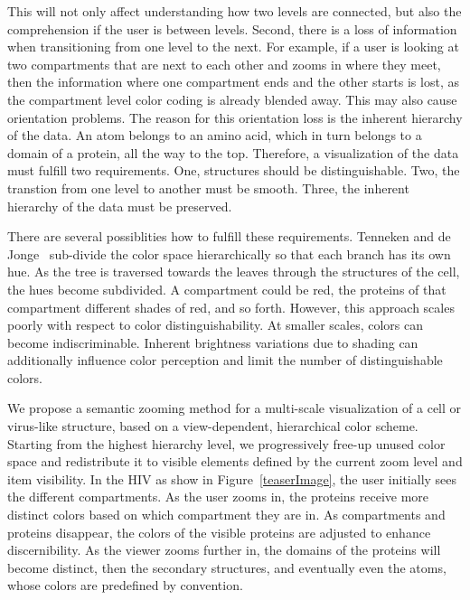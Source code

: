 \documentclass[review,journal]{vgtc}         %
\begin{document}
	This will not only affect understanding how two levels are connected, but also the comprehension if the user is between levels.
	Second, there is a loss of information when transitioning from one level to the next. 
	For example, if a user is looking at two compartments that are next to each other and zooms in where they meet, then the information where one compartment ends and the other starts is lost, as the compartment level color coding is already blended away. 
	This may also cause orientation problems.
	The reason for this orientation loss is the inherent hierarchy of the data.
	An atom belongs to an amino acid, which in turn belongs to a domain of a protein, all the way to the top.	
	Therefore, a visualization of the data must fulfill two requirements. 
	One, structures should be distinguishable.
	Two, the transtion from one level to another must be smooth.
	Three, the inherent hierarchy of the data must be preserved.
	
	There are several possiblities how to fulfill these requirements. 
	Tenneken and de Jonge~\cite{tennekes2014tree} sub-divide the color space hierarchically so that each branch has its own hue.
	As the tree is traversed towards the leaves through the structures of the cell, the hues become subdivided.
	A compartment could be red, the proteins of that compartment different shades of red, and so forth.
	However, this approach scales poorly with respect to color distinguishability. At smaller scales, colors can become indiscriminable.
	Inherent brightness variations due to shading can additionally influence color perception and limit the number of distinguishable colors.
	
	
	
	
	We propose a semantic zooming method for a multi-scale visualization of a cell or virus-like structure, based on a view-dependent, hierarchical color scheme.
	Starting from the highest hierarchy level, we progressively free-up unused color space and redistribute it to visible elements defined by the current zoom level and item visibility.
	In the HIV as show in Figure~\ref{teaserImage}, the user initially sees the different compartments. 
	As the user zooms in, the proteins receive more distinct colors based on which compartment they are in. 
	As compartments and proteins disappear, the colors of the visible proteins are adjusted to enhance discernibility.  
	As the viewer zooms further in, the domains of the proteins will become distinct, then the secondary structures, and eventually even the atoms, whose colors are predefined by convention.
	
\end{document}
